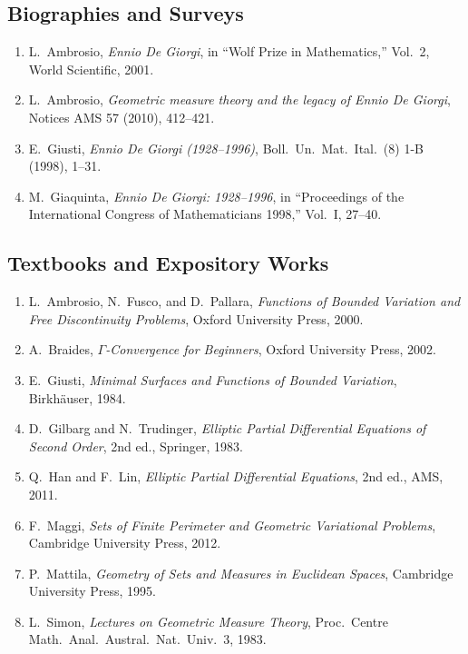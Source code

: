 \subsection*{Biographies and Surveys}
\begin{enumerate}
    \item L.\ Ambrosio, \textit{Ennio De Giorgi}, in ``Wolf Prize in Mathematics,'' Vol.\ 2, World Scientific, 2001.
    \item L.\ Ambrosio, \textit{Geometric measure theory and the legacy of Ennio De Giorgi}, Notices AMS 57 (2010), 412--421.
    \item E.\ Giusti, \textit{Ennio De Giorgi (1928--1996)}, Boll.\ Un.\ Mat.\ Ital.\ (8) 1-B (1998), 1--31.
    \item M.\ Giaquinta, \textit{Ennio De Giorgi: 1928--1996}, in ``Proceedings of the International Congress of Mathematicians 1998,'' Vol.\ I, 27--40.
\end{enumerate}

\subsection*{Textbooks and Expository Works}
\begin{enumerate}
    \item L.\ Ambrosio, N.\ Fusco, and D.\ Pallara, \textit{Functions of Bounded Variation and Free Discontinuity Problems}, Oxford University Press, 2000.
    \item A.\ Braides, \textit{\(\Gamma\)-Convergence for Beginners}, Oxford University Press, 2002.
    \item E.\ Giusti, \textit{Minimal Surfaces and Functions of Bounded Variation}, Birkh\"auser, 1984.
    \item D.\ Gilbarg and N.\ Trudinger, \textit{Elliptic Partial Differential Equations of Second Order}, 2nd ed., Springer, 1983.
    \item Q.\ Han and F.\ Lin, \textit{Elliptic Partial Differential Equations}, 2nd ed., AMS, 2011.
    \item F.\ Maggi, \textit{Sets of Finite Perimeter and Geometric Variational Problems}, Cambridge University Press, 2012.
    \item P.\ Mattila, \textit{Geometry of Sets and Measures in Euclidean Spaces}, Cambridge University Press, 1995.
    \item L.\ Simon, \textit{Lectures on Geometric Measure Theory}, Proc.\ Centre Math.\ Anal.\ Austral.\ Nat.\ Univ.\ 3, 1983.
\end{enumerate}

